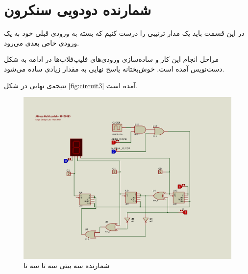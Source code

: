 \chapter{
شمارنده دودویی سنکرون
}

در این قسمت باید یک مدار ترتیبی را درست کنیم که بسته به ورودی قبلی خود به یک ورودی خاص بعدی می‌رود.

مراحل انجام این کار و ساده‌سازی ورودی‌های فلیپ‌فلاپ‌ها در ادامه به شکل دست‌نویس آمده است.
خوش‌بختانه پاسخ نهایی به مقدار زیادی ساده می‌شود.

نتیجه‌ی نهایی در شکل
\eqref{fig:circuit3}
آمده است.

\begin{figure}
    \centering
    \includegraphics[width=\textwidth]{part2/image.png}
    \caption{
    شمارنده سه بیتی سه تا سه تا
    }
    \label{fig:circuit3}
\end{figure}